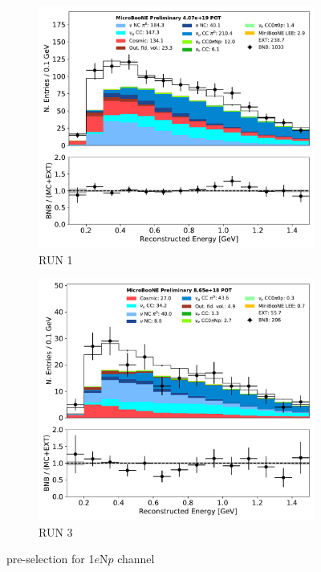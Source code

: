 \documentclass[a4paper]{article}
\begin{document}
\begin{figure}[ht] 
\begin{center}
    \begin{subfigure}[b]{0.45\textwidth}
    \centering
    \includegraphics[width=1.00\textwidth]{1eNp/reco_e_01162020_RUN1.pdf}
    \caption{\label{fig:1eNp:prsel:RUN1} RUN 1}
    \end{subfigure}
    \begin{subfigure}[b]{0.45\textwidth}
    \centering
    \includegraphics[width=1.00\textwidth]{1eNp/reco_e_01162020_RUN3.pdf}
    \caption{\label{fig:1eNp:prsel:RUN1} RUN 3}
    \end{subfigure}
\caption{\label{fig:1eNp:prsel}pre-selection for 1$e$N$p$ channel}
\end{center}
\end{figure}
\end{document}
